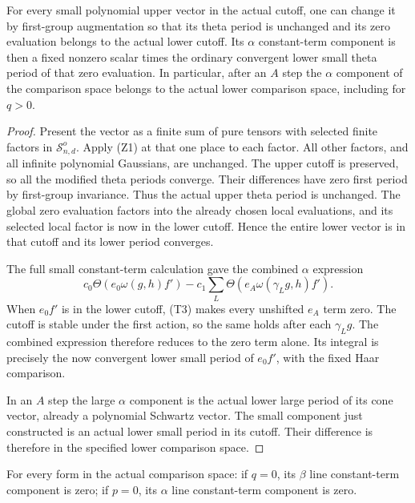 \begin{srproposition}
\label{prop:sr-theta-small-alpha-realization}
For every small polynomial upper vector in the actual cutoff,
one can change it by first-group augmentation so that its theta
period is unchanged and its zero evaluation belongs to the
actual lower cutoff. Its \(\alpha\) constant-term component is
then a fixed nonzero scalar times the ordinary convergent
lower small theta period of that zero evaluation.
In particular, after an \(A\) step the \(\alpha\) component
of the comparison space belongs to the actual lower comparison
space, including for \(q>0\).
\end{srproposition}

\begin{proof}
Present the vector as a finite sum of pure tensors with selected
finite factors in \(\mathcal S^o_{n,d}\).
Apply (Z1) at that one place to each factor. All other factors,
and all infinite polynomial Gaussians, are unchanged.
The upper cutoff is preserved, so all the modified theta
periods converge. Their differences have zero first period
by first-group invariance. Thus the actual upper theta period
is unchanged. The global zero evaluation factors into the
already chosen local evaluations, and its selected local
factor is now in the lower cutoff. Hence the entire lower
vector is in that cutoff and its lower period converges.

The full small constant-term calculation gave the combined
\(\alpha\) expression
\[
 c_0\Theta(e_0\omega(g,h)f')
      -c_1\sum_L
             \Theta(e_A\omega(\gamma_Lg,h)f').
\]
When \(e_0f'\) is in the lower cutoff, (T3) makes every
unshifted \(e_A\) term zero. The cutoff is stable under the
first action, so the same holds after each \(\gamma_Lg\).
The combined expression therefore reduces to the zero term
alone. Its integral is precisely the now convergent lower
small period of \(e_0f'\), with the fixed Haar comparison.

In an \(A\) step the large \(\alpha\) component is the actual
lower large period of its cone vector, already a polynomial
Schwartz vector. The small component just constructed is an
actual lower small period in its cutoff. Their difference is
therefore in the specified lower comparison space.
\end{proof}

\begin{srcorollary}
\label{cor:sr-theta-boundary-component-zero}
For every form in the actual comparison space:
if \(q=0\), its \(\beta\) line constant-term component is zero;
if \(p=0\), its \(\alpha\) line constant-term component is zero.
\end{srcorollary}

